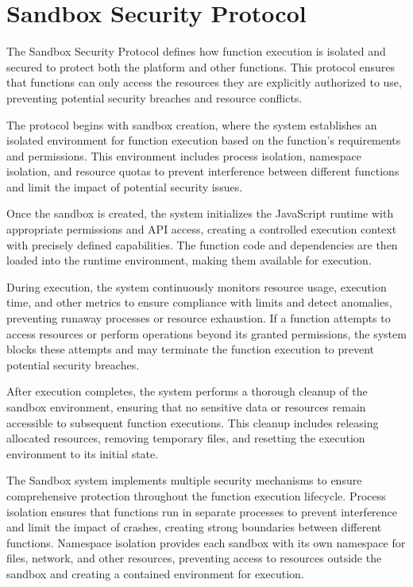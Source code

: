 \documentclass[11pt]{article}
\begin{document}
\section{Sandbox Security Protocol}
\label{subsec:sandbox-protocol-spec}

The Sandbox Security Protocol defines how function execution is isolated and secured to protect both the platform and other functions. This protocol ensures that functions can only access the resources they are explicitly authorized to use, preventing potential security breaches and resource conflicts.


The protocol begins with sandbox creation, where the system establishes an isolated environment for function execution based on the function's requirements and permissions. This environment includes process isolation, namespace isolation, and resource quotas to prevent interference between different functions and limit the impact of potential security issues.

Once the sandbox is created, the system initializes the JavaScript runtime with appropriate permissions and API access, creating a controlled execution context with precisely defined capabilities. The function code and dependencies are then loaded into the runtime environment, making them available for execution.

During execution, the system continuously monitors resource usage, execution time, and other metrics to ensure compliance with limits and detect anomalies, preventing runaway processes or resource exhaustion. If a function attempts to access resources or perform operations beyond its granted permissions, the system blocks these attempts and may terminate the function execution to prevent potential security breaches.

After execution completes, the system performs a thorough cleanup of the sandbox environment, ensuring that no sensitive data or resources remain accessible to subsequent function executions. This cleanup includes releasing allocated resources, removing temporary files, and resetting the execution environment to its initial state.

The Sandbox system implements multiple security mechanisms to ensure comprehensive protection throughout the function execution lifecycle. Process isolation ensures that functions run in separate processes to prevent interference and limit the impact of crashes, creating strong boundaries between different functions. Namespace isolation provides each sandbox with its own namespace for files, network, and other resources, preventing access to resources outside the sandbox and creating a contained environment for execution.
\end{document}
